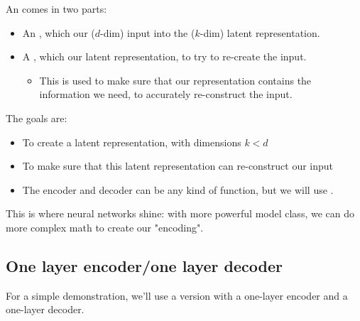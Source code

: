        \begin{definition}
            An  comes in two parts:

            \begin{itemize}
                \item An , which  our ($d$-dim) input into the ($k$-dim) latent representation.

                \item A , which  our latent representation, to try to re-create the input.
                    \begin{itemize}
                        \item This is used to make sure that our representation contains the information we need, to accurately re-construct the input.
                    \end{itemize}
            \end{itemize}

            The goals are:

            \begin{itemize}
                \item To create a  latent representation, with dimensions $k < d$
                \item To make sure that this latent representation can  re-construct our input
            \end{itemize}

            \subsecdiv

            \begin{itemize}
                \item The encoder and decoder can be any kind of function, but we will use .
            \end{itemize}
        \end{definition}

        This is where neural networks shine: with more powerful model class, we can do more complex math to create our "encoding".

        

    \subsection{One layer encoder/one layer decoder}

        For a simple demonstration, we'll use a version with a one-layer encoder and a one-layer decoder.

